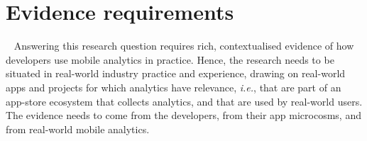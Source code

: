 \section{Evidence requirements}~\label{methodology-evidence-requirements}
Answering this research question requires rich, contextualised evidence of how developers use mobile analytics in practice.  
Hence, the research needs to be situated in real-world industry practice and experience, drawing on real-world apps and projects for which analytics have relevance, \textit{i.e.}, that are part of an app-store ecosystem that collects analytics, and that are used by real-world users. The evidence needs to come from the developers, from their app microcosms, and from real-world mobile analytics.




